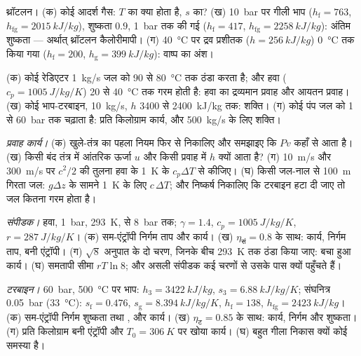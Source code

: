\begin{exercise}[$\star$]\label{exo:b2:open-systems:3}
थ्रॉटलन। (क) कोई आदर्श गैस: $T$ का क्या होता है, $s$ का? (ख) \qty{10}{bar} पर
गीली भाप ($h_{\text{f}} = 763$, $h_{\text{fg}} = \qty{2015}{kJ/kg}$),
शुष्कता $0.9$, \qty{1}{bar} तक  की गई ($h_{\text{f}} = 417$, $h_{\text{fg}}
= \qty{2258}{kJ/kg}$): अंतिम शुष्कता --- अर्थात् थ्रॉटलन कैलोरीमापी। (ग)
\qty{40}{\celsius} पर द्रव प्रशीतक ($h = \qty{256}{kJ/kg}$)
\qty{0}{\celsius} तक  किया गया ($h_{\text{f}} = 200$, $h_{\text{g}} = \qty{399}{kJ/kg}$):
वाष्प का अंश।
\end{exercise}

\begin{exercise}[$\star$]\label{exo:b2:open-systems:4}
(क) कोई रेडिएटर \qty{1}{kg/s} जल को \qty{90}{} से \qty{80}{\celsius} तक ठंडा करता है;
और हवा ($c_p = \qty{1005}{J/kg/K}$) \qty{20}{} से \qty{40}{\celsius} तक गरम होती है:
हवा का द्रव्यमान प्रवाह और आयतन प्रवाह। (ख) कोई भाप-टरबाइन, \qty{10}{kg/s},
$h$ \qty{3400}{} से \qty{2400}{kJ/kg} तक: शक्ति। (ग) कोई पंप
जल को \qty{1}{} से \qty{60}{bar} तक चढ़ाता है: प्रति किलोग्राम कार्य, और
\qty{500}{kg/s} के लिए शक्ति।
\end{exercise}

\begin{exercise}[$\star\star$]\label{exo:b2:open-systems:5}
\emph{प्रवाह कार्य।} (क) खुले-तंत्र का पहला नियम फिर से निकालिए और
समझाइए कि $Pv$ कहाँ से आता है। (ख) किसी बंद तंत्र में आंतरिक ऊर्जा $u$
और किसी प्रवाह में $h$ क्यों आता है? (ग) \qty{10}{m/s} और \qty{300}{m/s} पर
$c^2/2$ की तुलना हवा के \qty{1}{K} के $c_p\Delta T$ से कीजिए।
(घ) किसी जल-नाल से \qty{100}{m} गिरता जल: $g\Delta z$ के सामने
\qty{1}{K} के लिए $c\,\Delta T$; और निष्कर्ष निकालिए कि टरबाइन हटा दी जाए तो
जल कितना गरम होता है।
\end{exercise}

\begin{exercise}[$\star\star$]\label{exo:b2:open-systems:6}
\emph{संपीडक।} हवा, \qty{1}{bar}, \qty{293}{K}, से \qty{8}{bar} तक; $\gamma =
1.4$, $c_p = \qty{1005}{J/kg/K}$, $r = \qty{287}{J/kg/K}$। (क) सम-एंट्रॉपी
निर्गम ताप और कार्य। (ख) $\eta_{\text{सं}} = 0.8$ के साथ: कार्य, निर्गम
ताप, बनी एंट्रॉपी। (ग) $\sqrt8$ अनुपात के दो चरण, जिनके बीच
\qty{293}{K} तक ठंडा किया जाए: बचा हुआ कार्य। (घ) समतापी
सीमा $rT\ln 8$; और असली संपीडक कई चरणों से उसके पास क्यों पहुँचते हैं।
\end{exercise}

\begin{exercise}[$\star\star$]\label{exo:b2:open-systems:7}
\emph{टरबाइन।} \qty{60}{bar}, \qty{500}{\celsius} पर भाप: $h_3 = \qty{3422}{kJ/kg}$,
$s_3 = \qty{6.88}{kJ/kg/K}$; संघनित्र \qty{0.05}{bar} (\qty{33}{\celsius}):
$s_{\text{f}} = 0.476$, $s_{\text{g}} = \qty{8.394}{kJ/kg/K}$, $h_{\text{f}} = 138$,
$h_{\text{fg}} = \qty{2423}{kJ/kg}$। (क) सम-एंट्रॉपी निर्गम शुष्कता तथा
, और कार्य। (ख) $\eta_{\text{ट}} = 0.85$ के साथ: कार्य, निर्गम  और
शुष्कता। (ग) प्रति किलोग्राम बनी एंट्रॉपी और $T_0 =
\qty{306}{K}$ पर खोया कार्य। (घ) बहुत गीला निकास क्यों कोई समस्या है।
\end{exercise}

